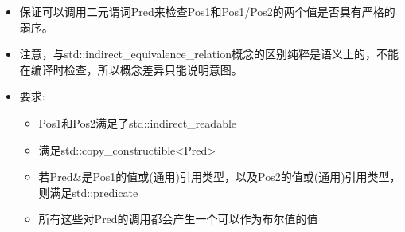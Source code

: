 
\begin{itemize}
\item
保证可以调用二元谓词Pred来检查Pos1和Pos1/Pos2的两个值是否具有严格的弱序。

\item
注意，与std::indirect\_equivalence\_relation概念的区别纯粹是语义上的，不能在编译时检查，所以概念差异只能说明意图。

\item
要求:
\begin{itemize}
\item
Pos1和Pos2满足了std::indirect\_readable

\item
满足std::copy\_constructible<Pred>

\item
若Pred\&是Pos1的值或(通用)引用类型，以及Pos2的值或(通用)引用类型，则满足std::predicate

\item
所有这些对Pred的调用都会产生一个可以作为布尔值的值
\end{itemize}
\end{itemize}










